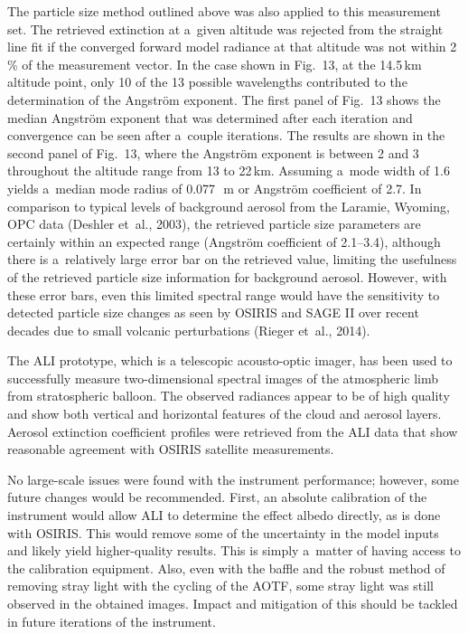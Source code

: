 \documentclass[amt]{copernicus}
\begin{document}
The particle size method outlined above was also applied to this
measurement set. The retrieved extinction at a~given altitude was
rejected from the straight line fit if the converged forward model
radiance at that altitude was not within 2\,{\%} of the measurement
vector. In the case shown in Fig.~13, at the 14.5\,\unit{km} altitude
point, only 10 of the 13 possible wavelengths contributed to the
determination of the Angstr\"{o}m exponent. The first panel of Fig.~13
shows the median Angstr\"{o}m exponent that was determined after each
iteration and convergence can be seen after a~couple iterations. The
results are shown in the second panel of Fig.~13, where the
Angstr\"{o}m exponent is between 2 and 3 throughout the altitude range
from 13 to 22\,\unit{km}. Assuming a~mode width of 1.6 yields a~median
mode radius of 0.077\,\unit{{\mu}m} or Angstr\"{o}m coefficient of 2.7. In comparison to typical levels
of background aerosol from the Laramie, Wyoming, OPC data (Deshler
et~al., 2003), the retrieved particle size parameters are certainly
within an expected range (Angstr\"{o}m coefficient of 2.1--3.4), although there is a~relatively large error
bar on the retrieved value, limiting the usefulness of the retrieved
particle size information for background aerosol. However, with these
error bars, even this limited spectral range would have the
sensitivity to detected particle size changes as seen by OSIRIS and
SAGE II over recent decades due to small volcanic perturbations
(Rieger et~al., 2014).\hack{\vspace{-3mm}}

\conclusions

The ALI prototype, which is a telescopic acousto-optic imager, has been
used to successfully measure two-dimensional spectral images of the
atmospheric limb from stratospheric balloon. The observed radiances
appear to be of high quality and show both vertical and horizontal
features of the cloud and aerosol layers. Aerosol extinction
coefficient profiles were retrieved from the ALI data that show
reasonable agreement with OSIRIS satellite measurements.

No large-scale issues were found with the instrument performance;
however, some future changes would be recommended. First, an absolute
calibration of the instrument would allow ALI to determine the effect
albedo directly, as is done with OSIRIS. This would remove some of the
uncertainty in the model inputs and likely yield higher-quality
results. This is simply a~matter of having access to the calibration
equipment. Also, even with the baffle and the robust method of
removing stray light with the cycling of the AOTF, some stray light
was still observed in the obtained images. Impact and mitigation of
this should be tackled in future iterations of the instrument.
\end{document}
